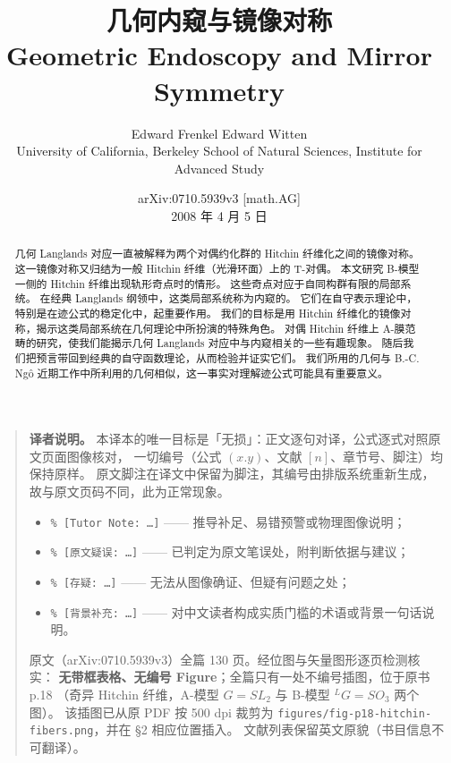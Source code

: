 \documentclass[11pt,a4paper]{article}
\newenvironment{translatornote}
  {\begin{quote}\small\noindent\ignorespaces}
  {\end{quote}\medskip}
\begin{document}
\title{\bfseries 几何内窥与镜像对称\\[0.6em]
       \large Geometric Endoscopy and Mirror Symmetry}
\author{Edward Frenkel \quad Edward Witten\\[0.3em]
        \small University of California, Berkeley \quad
        School of Natural Sciences, Institute for Advanced Study}
\date{\small arXiv:0710.5939v3 [math.AG]\\[0.2em]
      \small 2008 年 4 月 5 日}
\maketitle

\begin{abstract}
\noindent
几何 Langlands 对应一直被解释为两个对偶约化群的 Hitchin 纤维化之间的镜像对称。
这一镜像对称又归结为一般 Hitchin 纤维（光滑环面）上的 T-对偶。
本文研究 B-模型一侧的 Hitchin 纤维出现轨形奇点时的情形。
这些奇点对应于自同构群有限的局部系统。
在经典 Langlands 纲领中，这类局部系统称为内窥的。
它们在自守表示理论中，特别是在迹公式的稳定化中，起重要作用。
我们的目标是用 Hitchin 纤维化的镜像对称，揭示这类局部系统在几何理论中所扮演的特殊角色。
对偶 Hitchin 纤维上 A-膜范畴的研究，使我们能揭示几何 Langlands 对应中与内窥相关的一些有趣现象。
随后我们把预言带回到经典的自守函数理论，从而检验并证实它们。
我们所用的几何与 B.-C. Ngô 近期工作中所利用的几何相似，这一事实对理解迹公式可能具有重要意义。
\end{abstract}

\begin{translatornote}
\textbf{译者说明。}
本译本的唯一目标是「无损」：正文逐句对译，公式逐式对照原文页面图像核对，
一切编号（公式 $(x.y)$、文献 $[n]$、章节号、脚注）均保持原样。
原文脚注在译文中保留为脚注，其编号由排版系统重新生成，故与原文页码不同，此为正常现象。

\begin{itemize}[leftmargin=2em,itemsep=1pt,topsep=2pt]
\item \texttt{\% [Tutor Note: \dots]} —— 推导补足、易错预警或物理图像说明；
\item \texttt{\% [原文疑误: \dots]} —— 已判定为原文笔误处，附判断依据与建议；
\item \texttt{\% [存疑: \dots]} —— 无法从图像确证、但疑有问题之处；
\item \texttt{\% [背景补充: \dots]} —— 对中文读者构成实质门槛的术语或背景一句话说明。
\end{itemize}

原文（arXiv:0710.5939v3）全篇 130 页。经位图与矢量图形逐页检测核实：
\textbf{无带框表格、无编号 Figure}；全篇只有一处不编号插图，位于原书 p.18
（奇异 Hitchin 纤维，A-模型 $G=SL_2$ 与 B-模型 ${}^{L}G=SO_3$ 两个图）。
该插图已从原 PDF 按 500 dpi 裁剪为 \texttt{figures/fig-p18-hitchin-fibers.png}，并在 §2 相应位置插入。
文献列表保留英文原貌（书目信息不可翻译）。
\end{translatornote}
\end{document}
